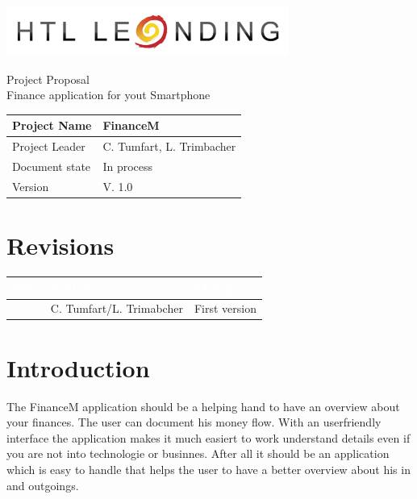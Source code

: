 \documentclass[12pt]{article}
\theoremstyle{definition}
\newcommand{\projectname}{FinanceM}
\newcommand{\productname}{Finance application for yout Smartphone}
\newcommand{\projectleader}{C. Tumfart, L. Trimbacher}
\newcommand{\documentstatus}{In process}
\newcommand{\version}{V. 1.0}
\begin{document}
\begin{titlepage}
\begin{flushright}
\includegraphics[scale=.5]{htlleondinglogo.png}\\
\end{flushright}

\vspace{10em}

\begin{center}
{\Huge Project Proposal} \\[3em]
{\LARGE \productname} \\[3em]
\end{center}

\begin{flushleft}
\begin{tabular}{|l|l|}
\hline
Project Name & \projectname \\ \hline
Project Leader & \projectleader \\ \hline
Document state & \documentstatus \\ \hline
Version & \version \\ \hline
\end{tabular}
\end{flushleft}

\end{titlepage}
\section*{Revisions}
\begin{tabular}{|l|l|l|}
\hline
\cellcolor[gray]{0.5}\textcolor{white}{Date} & \cellcolor[gray]{0.5}\textcolor{white}{Author} & \cellcolor[gray]{0.5}\textcolor{white}{Change} \\ \hline
&C. Tumfart/L. Trimabcher&First version \\ \hline
\end{tabular}
\pagebreak

\tableofcontents
\pagebreak

\section{Introduction}
The FinanceM application should be a helping hand to have an overview about your finances. The user can document his money flow. 
With an userfriendly interface the application makes it much easiert to work understand details even if you are not into technologie or businnes.
After all it should be an application which is easy to handle that helps the user to have a better overview about his in and outgoings.
\pagebreak
\end{document}
